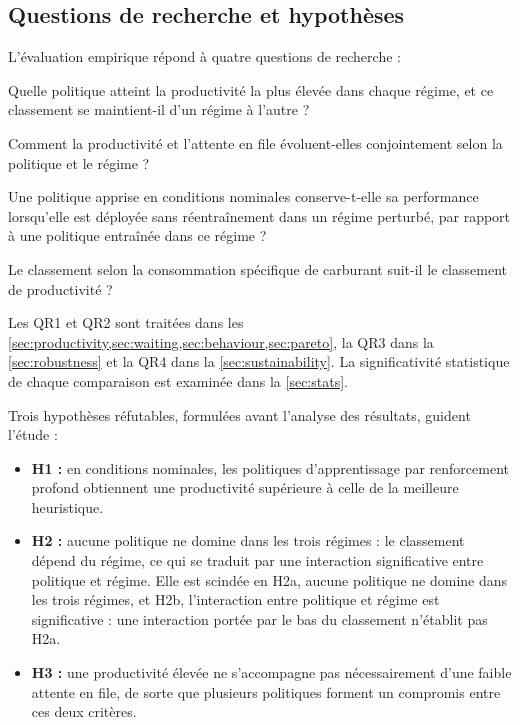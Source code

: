 \documentclass[11pt,a4paper]{article}
\newif\ifrevmarks
\newcommand{\revtag}[1]{\ifrevmarks\textsuperscript{\textcolor{red!70!black}{\scriptsize[#1]}}\fi}
\newenvironment{revbloc}[1]{\par\ifrevmarks\color{revcolor}\noindent\revtag{#1}\ \fi}{\par}
\newif\ifcorrmarks
\newcommand{\corr}[1]{\ifcorrmarks\textcolor{corrcolor}{#1}\else#1\fi}
\begin{document}
\subsection{Questions de recherche et hypothèses}
\label{sec:rq}

\begin{revbloc}{M23}
L'évaluation empirique répond à quatre questions de recherche :

\begin{description}[leftmargin=1.2cm,labelwidth=1.0cm]
  \item[QR1] Quelle politique atteint la productivité la plus élevée dans chaque régime, et ce classement se maintient-il d'un régime à l'autre ?
  \item[QR2] Comment la productivité et l'attente en file évoluent-elles conjointement selon la politique et le régime ?
  \item[QR3] Une politique apprise en conditions nominales conserve-t-elle sa performance lorsqu'elle est déployée sans réentraînement dans un régime perturbé, par rapport à une politique entraînée dans ce régime ?
  \item[QR4] Le classement selon la consommation spécifique de carburant suit-il le classement de productivité ?
\end{description}

Les QR1 et QR2 sont traitées dans les \cref{sec:productivity,sec:waiting,sec:behaviour,sec:pareto}, la QR3 dans la \cref{sec:robustness} et la QR4 dans la \cref{sec:sustainability}. La significativité statistique de chaque comparaison est examinée dans la \cref{sec:stats}.

Trois hypothèses réfutables, formulées avant l'analyse des résultats, guident l'étude :

\begin{itemize}
  \item \textbf{H1 :} en conditions nominales, les politiques d'apprentissage par renforcement profond obtiennent une productivité supérieure à celle de la meilleure heuristique.
  \item \textbf{H2 :} aucune politique ne domine dans les trois régimes : le classement dépend du régime, ce qui se traduit par une interaction significative entre politique et régime. \corr{Elle est scindée en H2a, aucune politique ne domine dans les trois régimes, et H2b, l'interaction entre politique et régime est significative : une interaction portée par le bas du classement n'établit pas H2a.}
  \item \textbf{H3 :} une productivité élevée ne s'accompagne pas nécessairement d'une faible attente en file, de sorte que plusieurs politiques forment un compromis entre ces deux critères.
\end{itemize}
\end{revbloc}
\end{document}
